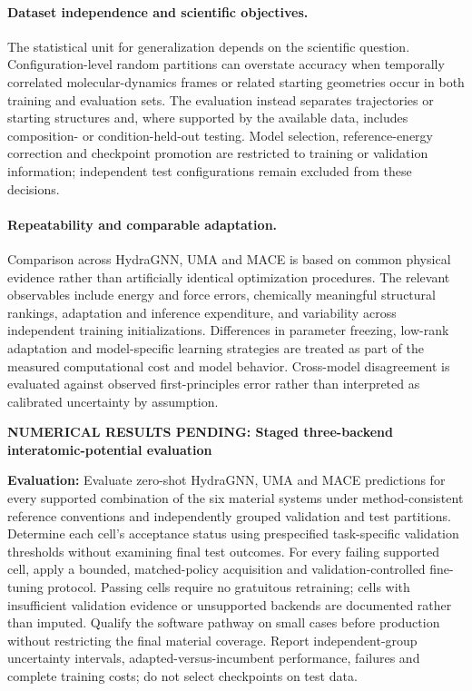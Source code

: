 \documentclass[11pt,a4paper]{article}
\newcommand{\newexperiment}[2]{\par\medskip\noindent\begingroup\color{red!80!black}\textbf{NUMERICAL RESULTS PENDING: #1}\par\noindent\textbf{Evaluation:} #2\par\endgroup\medskip}
\begin{document}
\paragraph{Dataset independence and scientific objectives.}
The statistical unit for generalization depends on the scientific question. Configuration-level random partitions can overstate accuracy when temporally correlated molecular-dynamics frames or related starting geometries occur in both training and evaluation sets. The evaluation instead separates trajectories or starting structures and, where supported by the available data, includes composition- or condition-held-out testing. Model selection, reference-energy correction and checkpoint promotion are restricted to training or validation information; independent test configurations remain excluded from these decisions.

\paragraph{Repeatability and comparable adaptation.}
Comparison across HydraGNN, UMA and MACE is based on common physical evidence rather than artificially identical optimization procedures. The relevant observables include energy and force errors, chemically meaningful structural rankings, adaptation and inference expenditure, and variability across independent training initializations. Differences in parameter freezing, low-rank adaptation and model-specific learning strategies are treated as part of the measured computational cost and model behavior. Cross-model disagreement is evaluated against observed first-principles error rather than interpreted as calibrated uncertainty by assumption.

\newexperiment{Staged three-backend interatomic-potential evaluation}{Evaluate zero-shot HydraGNN, UMA and MACE predictions for every supported combination of the six material systems under method-consistent reference conventions and independently grouped validation and test partitions. Determine each cell's acceptance status using prespecified task-specific validation thresholds without examining final test outcomes. For every failing supported cell, apply a bounded, matched-policy acquisition and validation-controlled fine-tuning protocol. Passing cells require no gratuitous retraining; cells with insufficient validation evidence or unsupported backends are documented rather than imputed. Qualify the software pathway on small cases before production without restricting the final material coverage. Report independent-group uncertainty intervals, adapted-versus-incumbent performance, failures and complete training costs; do not select checkpoints on test data.}
\end{document}
